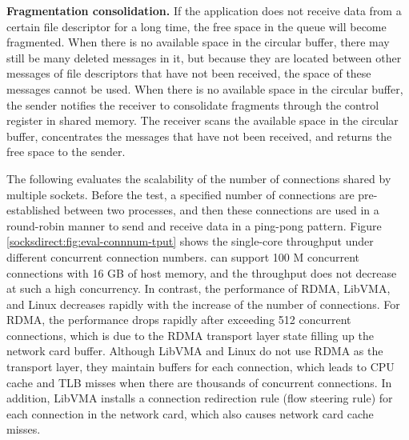 \textbf{Fragmentation consolidation.}
If the application does not receive data from a certain file descriptor for a long time, the free space in the queue will become fragmented.
When there is no available space in the circular buffer, there may still be many deleted messages in it, but because they are located between other messages of file descriptors that have not been received, the space of these messages cannot be used.
When there is no available space in the circular buffer, the sender notifies the receiver to consolidate fragments through the control register in shared memory.
The receiver scans the available space in the circular buffer, concentrates the messages that have not been received, and returns the free space to the sender.


The following evaluates the scalability of the number of connections shared by multiple sockets. Before the test, a specified number of connections are pre-established between two processes, and then these connections are used in a round-robin manner to send and receive data in a ping-pong pattern. Figure \ref{socksdirect:fig:eval-connnum-tput} shows the single-core throughput under different concurrent connection numbers. \sys{} can support 100 M concurrent connections with 16 GB of host memory, and the throughput does not decrease at such a high concurrency. In contrast, the performance of RDMA, LibVMA, and Linux decreases rapidly with the increase of the number of connections. For RDMA, the performance drops rapidly after exceeding 512 concurrent connections, which is due to the RDMA transport layer state filling up the network card buffer. Although LibVMA and Linux do not use RDMA as the transport layer, they maintain buffers for each connection, which leads to CPU cache and TLB misses when there are thousands of concurrent connections. In addition, LibVMA installs a connection redirection rule (flow steering rule) for each connection in the network card, which also causes network card cache misses.

